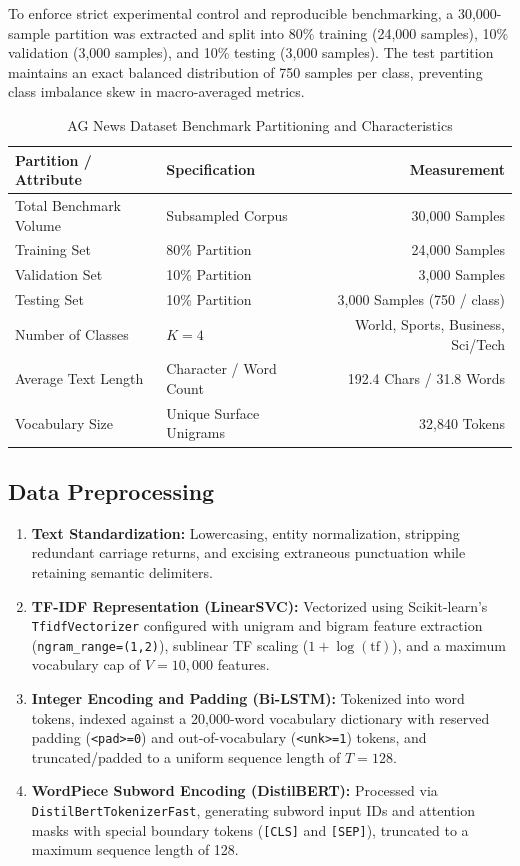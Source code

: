 To enforce strict experimental control and reproducible benchmarking, a 30,000-sample partition was extracted and split into 80\% training (24,000 samples), 10\% validation (3,000 samples), and 10\% testing (3,000 samples). The test partition maintains an exact balanced distribution of 750 samples per class, preventing class imbalance skew in macro-averaged metrics.

\begin{table}[H]
\centering
\caption{AG News Dataset Benchmark Partitioning and Characteristics}
\label{tab:exp9_dataset}
\begin{tabular}{llr}
\toprule
\textbf{Partition / Attribute} & \textbf{Specification} & \textbf{Measurement} \\
\midrule
Total Benchmark Volume & Subsampled Corpus & 30,000 Samples \\
Training Set & 80\% Partition & 24,000 Samples \\
Validation Set & 10\% Partition & 3,000 Samples \\
Testing Set & 10\% Partition & 3,000 Samples (750 / class) \\
Number of Classes & $K=4$ & World, Sports, Business, Sci/Tech \\
Average Text Length & Character / Word Count & 192.4 Chars / 31.8 Words \\
Vocabulary Size & Unique Surface Unigrams & 32,840 Tokens \\
\bottomrule
\end{tabular}
\end{table}

\subsection{Data Preprocessing}
\begin{enumerate}
    \item \textbf{Text Standardization:} Lowercasing, entity normalization, stripping redundant carriage returns, and excising extraneous punctuation while retaining semantic delimiters.
    \item \textbf{TF-IDF Representation (LinearSVC):} Vectorized using Scikit-learn's \lstinline|TfidfVectorizer| configured with unigram and bigram feature extraction (\lstinline|ngram_range=(1,2)|), sublinear TF scaling ($1 + \log(\text{tf})$), and a maximum vocabulary cap of $V = 10,000$ features.
    \item \textbf{Integer Encoding and Padding (Bi-LSTM):} Tokenized into word tokens, indexed against a 20,000-word vocabulary dictionary with reserved padding (\lstinline|<pad>=0|) and out-of-vocabulary (\lstinline|<unk>=1|) tokens, and truncated/padded to a uniform sequence length of $T = 128$.
    \item \textbf{WordPiece Subword Encoding (DistilBERT):} Processed via \lstinline|DistilBertTokenizerFast|, generating subword input IDs and attention masks with special boundary tokens (\lstinline|[CLS]| and \lstinline|[SEP]|), truncated to a maximum sequence length of 128.
\end{enumerate}

